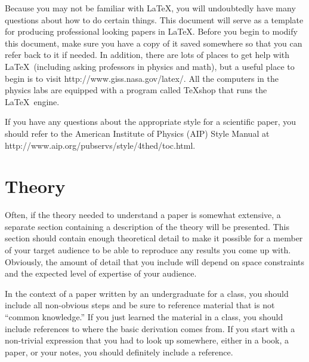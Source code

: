 \documentclass[preprint,pre,floats,aps,amsmath,amssymb]{revtex4}
\begin{document}
Because you may not be familiar with \LaTeX, you will undoubtedly have many questions about how to do certain things. This document will serve as a template for producing professional looking papers in \LaTeX. Before you begin to modify this document, make sure you have a copy of it saved somewhere so that you can refer back to it if needed. In addition, there are lots of places to get help with \LaTeX\ (including asking professors in physics and math), but a useful place to begin is to visit http://www.giss.nasa.gov/latex/. All the computers in the physics labs are equipped with a program called TeXshop that runs the \LaTeX\ engine.

If you have any questions about the appropriate style for a scientific paper, you should refer to the American Institute of Physics (AIP) Style Manual at http://www.aip.org/pubservs/style/4thed/toc.html.

\section{Theory}
\label{sec:theory}

Often, if the theory needed to understand a paper is somewhat extensive, a separate section containing a description of the theory will be presented. This section should contain enough theoretical detail to make it possible for a member of your target audience to be able to reproduce any results you come up with. Obviously, the amount of detail that you include will depend on space constraints and the expected level of expertise of your audience.

In the context of a paper written by an undergraduate for a class, you should include all non-obvious steps and be sure to reference material that is not ``common knowledge.'' If you just learned the material in a class, you should include references to where the basic derivation comes from. If you start with a non-trivial expression that you had to look up somewhere, either in a book, a paper, or your notes, you should definitely include a reference.
\end{document}
